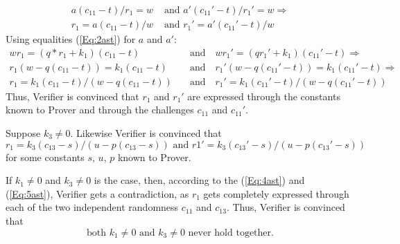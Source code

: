 \documentclass{mathcryptology} %
\theoremstyle{title}
\theoremstyle{titleof}
\renewenvironment{proof}{\noindent{\bfseries Proof:} }{}
\begin{document}
\begin{proof}
        \begin{align*}
            a \left(c_{11}  - t\right) / r_{1}  = w & \text{ and }
            a'\left(c_{11}' - t\right) / r_{1}' = w \Rightarrow \\
            r_{1} = a\left(c_{11} - t\right) / w & \text{ and }
            r_{1}' = a'\left(c_{11}' - t\right)/w
        \end{align*}        
        Using equalities (\ref{Eq:2ast}\label{**}) for $a$ and $a'$:
        \begin{align}
            w r_{1}  = \left(q* r_{1}  + k_{1}\right) \left(c_{11}  - t\right)
            &\quad\text{and}\quad
            w r_{1}' = \left(q  r_{1}' + k_{1}\right) \left(c_{11}' - t\right)
            \Rightarrow\nonumber\\
            r_{1} \left(w-q\left(c_{11} -t\right)\right) = k_{1} \left(c_{11}  - t\right)
            &\quad\text{and}\quad
            r_{1}'\left(w-q\left(c_{11}'-t\right)\right) = k_{1} \left(c_{11}' - t\right)
            \Rightarrow\nonumber\\
            r_{1} = k_{1} \left(c_{11} -t\right) / \left(w-q\left(c_{11} - t\right)\right)
            &\quad\text{and}\quad
            r_{1}'= k_{1} \left(c_{11}'-t\right) / \left(w-q\left(c_{11}'- t\right)\right)
            \label{Eq:4ast}\tag{****}
        \end{align}
        Thus, Verifier is convinced that $r_{1}$ and $r_{1}'$ are expressed through the constants known to Prover and through the challenges $c_{11}$ and $c_{11}'$.

        Suppose $k_{3}\neq0$. Likewise Verifier is convinced that
        \begin{equation}
            r_{1} = k_{3} \left(c_{13}  - s\right) / \left(u-p \left(c_{13} - s\right)\right) \text{ and }
            r1'   = k_{3} \left(c_{13}' - s\right) / \left(u-p \left(c_{13}'- s\right)\right)\label{Eq:5ast}\tag{*****}
        \end{equation}
        for some constants $s$, $u$, $p$ known to Prover.

        If $k_{1}\neq0$ and $k_{3}\neq0$ is the case, then, according to the (\ref{Eq:4ast}) and (\ref{Eq:5ast}), Verifier gets a contradiction, as $r_{1}$ gets completely expressed through each of the two independent randomness $c_{11}$ and $c_{13}$. Thus, Verifier is convinced that
        \begin{equation}\label{Eq:6ast}
            \text{both $k_{1}\neq0$ and $k_{3}\neq0$ never hold together.}\tag{******}
        \end{equation}


\end{proof}
\end{document}
